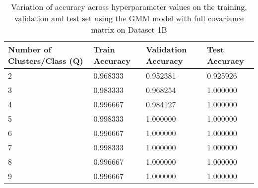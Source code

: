 \begin{table}[H]
\centering
\begin{tabular}{l l l l}
\hline
\hline
\textbf{Number of Clusters/Class (Q)} & \textbf{Train Accuracy} & \textbf{Validation Accuracy} & \textbf{Test Accuracy}\\
\hline
\hline
2 & 0.968333 & 0.952381 & 0.925926 \\
3 & 0.983333 & 0.968254 & 1.000000 \\
4 & 0.996667 & 0.984127 & 1.000000 \\
5 & 0.998333 & 1.000000 & 1.000000 \\
6 & 0.996667 & 1.000000 & 1.000000 \\
7 & 0.998333 & 1.000000 & 1.000000 \\
8 & 0.996667 & 1.000000 & 1.000000 \\
9 & 0.996667 & 1.000000 & 1.000000 \\
\hline
\end{tabular}
\caption{Variation of accuracy across hyperparameter values on the training, validation and test set using the GMM model with full covariance matrix on Dataset 1B}
\label{tab:1b_full}
\end{table}

